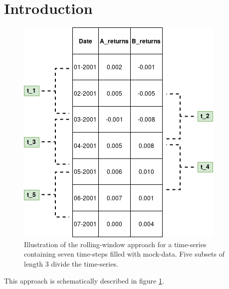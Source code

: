 \section{Introduction}

\begin{figure}[h]
  \begin{center}
    \includegraphics[width=.50\textwidth]{images/rolling_window.png}
    \caption{Illustration of the rolling-window approach for a time-series containing seven time-steps filled with mock-data. Five subsets of length 3 divide the time-series.}
    \label{fig:rolling_window}
  \end{center}
\end{figure}
This approach is schematically described in figure \ref{fig:rolling_window}.\\

